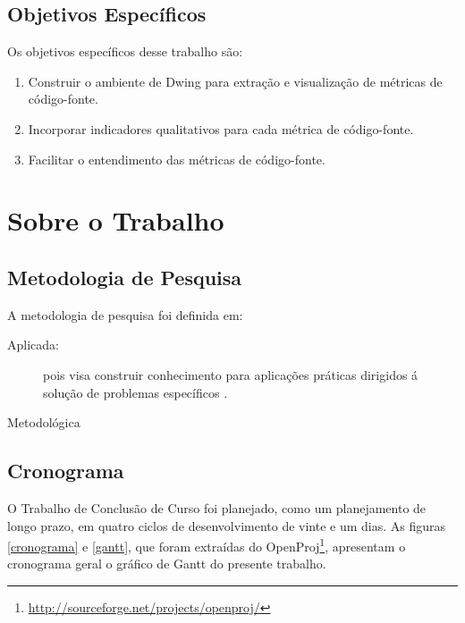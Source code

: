 
\subsection{Objetivos Específicos}

Os objetivos específicos desse trabalho são:

\begin{enumerate}
	
\item Construir o ambiente de Dwing para extração e visualização de métricas de 
código-fonte.
\item Incorporar indicadores qualitativos para cada métrica de código-fonte.
\item Facilitar o entendimento das métricas de código-fonte.

\end{enumerate}


\section{Sobre o Trabalho}
\subsection {Metodologia de Pesquisa}
A metodologia de pesquisa foi definida em:

\begin{description}

\item[Aplicada:] pois visa construir conhecimento para aplicações práticas 
dirigidos á solução de problemas específicos \cite{Gil2008}.

\item[Metodológica]

\end{description}

\subsection{Cronograma}
O Trabalho de Conclusão de Curso foi planejado, como um planejamento de 
longo prazo, em quatro ciclos de desenvolvimento de vinte e um dias. 
As figuras \ref{cronograma} e \ref{gantt}, que foram extraídas do 
OpenProj\footnote{\url{http://sourceforge.net/projects/openproj/}}, 
apresentam o cronograma geral o gráfico de Gantt do presente trabalho.

